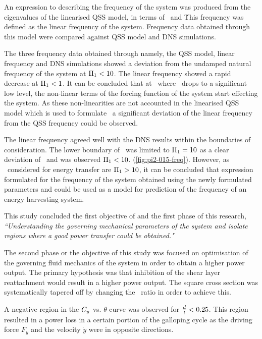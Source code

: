  An expression to describing the frequency of the system was produced from the eigenvalues of the linearised QSS model, in terms of \massstiff\ and \massdamp\. This frequency was defined as the linear frequency \freqlin of the system. Frequency data obtained through this model were compared against QSS model and DNS simulations.
 
 
 The three frequency data obtained through namely, the QSS model, linear frequency and DNS simulations showed a deviation from the undamped natural frequency of the system at $\Pi_1<10$. The linear frequency showed a rapid decrease at $\Pi_1<1$. It can be concluded that at \massstiff\, where \massstiff\ drops to a significant low level, the non-linear terms of the forcing function of the system start effecting the system. As these non-linearities are not accounted in the linearised QSS model which is used to formulate \freqlin\ a significant deviation of the linear frequency from the QSS frequency could be observed.
 
 The linear frequency agreed well with the DNS results within the boundaries of consideration. The lower boundary of \massstiff\ was limited to $\Pi_1=10$ as a clear deviation of \freqlin\ and \freqdns was observed $\Pi_1<10$. (\ref{fig:pi2-015-freq}). However, as \massstiff\ considered for energy transfer are $\Pi_1>10$, it can be concluded that expression formulated for the frequency of the system obtained using the newly formulated parameters \massstiff and \massdamp could be used as a model for prediction of the frequency of an energy harvesting system.  
 
 
 This study concluded the first objective of and the first phase of this research, \emph{``Understanding the governing mechanical parameters of the system and isolate regions where a good power transfer could be obtained."}
 
 The second phase or the objective of this study was focused on optimisation of the governing fluid mechanics of the system in order to obtain a higher power output. The primary hypothesis was that inhibition of the shear layer  reattachment would result in a higher power output. The square cross section was systematically tapered off by changing the \ratio\ ratio in order to achieve this.
 
 
  A negative region in the $C_{y}$ vs. $\theta$ curve was observed for $\frac{d}{l}<0.25$. This region resulted in a power loss in a certain portion of the galloping cycle as the driving force $F_y$ and the velocity $\dot{y}$ were in opposite directions.
 
